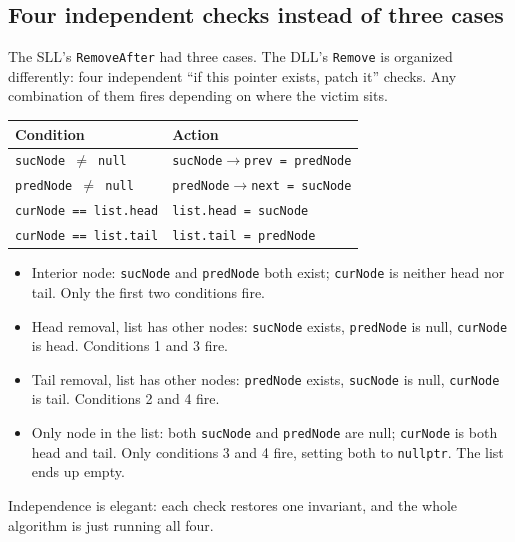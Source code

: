 \documentclass[11pt]{article}
\begin{document}
\subsection{Four independent checks instead of three cases}

The SLL's \texttt{RemoveAfter} had three cases. The DLL's
\texttt{Remove} is organized differently: four independent
``if this pointer exists, patch it'' checks. Any combination of
them fires depending on where the victim sits.

\begin{center}
\footnotesize
\renewcommand{\arraystretch}{1.3}
\begin{tabular}{@{}p{5.3cm}p{6.7cm}@{}}
\hline
\textbf{Condition} & \textbf{Action} \\
\hline
\texttt{sucNode $\neq$ null}    & \texttt{sucNode$\to$prev = predNode} \\
\texttt{predNode $\neq$ null}   & \texttt{predNode$\to$next = sucNode} \\
\texttt{curNode == list.head}   & \texttt{list.head = sucNode} \\
\texttt{curNode == list.tail}   & \texttt{list.tail = predNode} \\
\hline
\end{tabular}
\end{center}

\begin{ideabox}
\begin{itemize}[leftmargin=*]
  \item Interior node: \texttt{sucNode} and \texttt{predNode} both
        exist; \texttt{curNode} is neither head nor tail. Only the
        first two conditions fire.
  \item Head removal, list has other nodes: \texttt{sucNode}
        exists, \texttt{predNode} is null, \texttt{curNode} is
        head. Conditions 1 and 3 fire.
  \item Tail removal, list has other nodes: \texttt{predNode}
        exists, \texttt{sucNode} is null, \texttt{curNode} is tail.
        Conditions 2 and 4 fire.
  \item Only node in the list: both \texttt{sucNode} and
        \texttt{predNode} are null; \texttt{curNode} is both head
        and tail. Only conditions 3 and 4 fire, setting both to
        \texttt{nullptr}. The list ends up empty.
\end{itemize}
Independence is elegant: each check restores one invariant, and
the whole algorithm is just running all four.
\end{ideabox}
\end{document}
